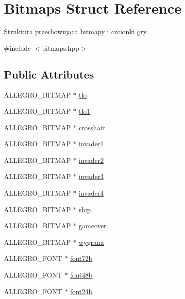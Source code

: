 \hypertarget{struct_bitmaps}{}\section{Bitmaps Struct Reference}
\label{struct_bitmaps}


Struktura przechowujaca bitmapy i czcionki gry.  




{\ttfamily \#include $<$bitmaps.\+hpp$>$}

\subsection*{Public Attributes}
\begin{DoxyCompactItemize}
\item 
A\+L\+L\+E\+G\+R\+O\+\_\+\+B\+I\+T\+M\+AP $\ast$ \hyperlink{struct_bitmaps_ad75c5906de7630960be96318a9ec8322}{tlo}
\item 
A\+L\+L\+E\+G\+R\+O\+\_\+\+B\+I\+T\+M\+AP $\ast$ \hyperlink{struct_bitmaps_aac910c3498ee3aae8349b455ad85b765}{tlo1}
\item 
A\+L\+L\+E\+G\+R\+O\+\_\+\+B\+I\+T\+M\+AP $\ast$ \hyperlink{struct_bitmaps_afe9dc39c95d496b9b0fc49eee3463ac5}{crosshair}
\item 
A\+L\+L\+E\+G\+R\+O\+\_\+\+B\+I\+T\+M\+AP $\ast$ \hyperlink{struct_bitmaps_ad3748610cce54943cfba567094c5c6b0}{invader1}
\item 
A\+L\+L\+E\+G\+R\+O\+\_\+\+B\+I\+T\+M\+AP $\ast$ \hyperlink{struct_bitmaps_af64f12ab8f479295019205fc480779ac}{invader2}
\item 
A\+L\+L\+E\+G\+R\+O\+\_\+\+B\+I\+T\+M\+AP $\ast$ \hyperlink{struct_bitmaps_a6386172f03488c2bf34844d9461bb1b3}{invader3}
\item 
A\+L\+L\+E\+G\+R\+O\+\_\+\+B\+I\+T\+M\+AP $\ast$ \hyperlink{struct_bitmaps_aad11087b214a9c02053bd4c19ea2d5b9}{invader4}
\item 
A\+L\+L\+E\+G\+R\+O\+\_\+\+B\+I\+T\+M\+AP $\ast$ \hyperlink{struct_bitmaps_a6a15fc60fea8423a96f927b0730ee7fe}{ship}
\item 
A\+L\+L\+E\+G\+R\+O\+\_\+\+B\+I\+T\+M\+AP $\ast$ \hyperlink{struct_bitmaps_a61f45233275a8c385c1c48e9fb4e7386}{gameover}
\item 
A\+L\+L\+E\+G\+R\+O\+\_\+\+B\+I\+T\+M\+AP $\ast$ \hyperlink{struct_bitmaps_a6fe9a8656cec2a659f6b4882d2ee4b2d}{wygrana}
\item 
A\+L\+L\+E\+G\+R\+O\+\_\+\+F\+O\+NT $\ast$ \hyperlink{struct_bitmaps_a506477a9cf5c68f1b470de7102396794}{font72b}
\item 
A\+L\+L\+E\+G\+R\+O\+\_\+\+F\+O\+NT $\ast$ \hyperlink{struct_bitmaps_a3ec81a0bd11178b615f8aae0c0df9be6}{font48b}
\item 
A\+L\+L\+E\+G\+R\+O\+\_\+\+F\+O\+NT $\ast$ \hyperlink{struct_bitmaps_a864ceb68e32314229fdb76145a065f1d}{font24b}
\end{DoxyCompactItemize}


